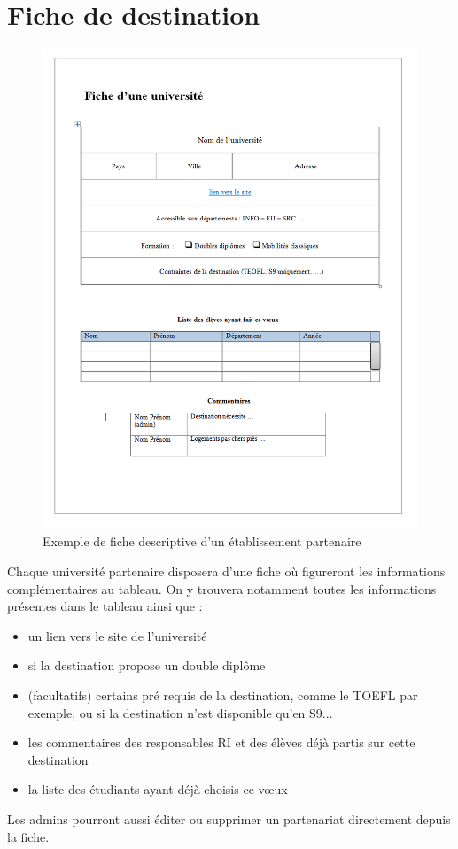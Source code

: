  \section{Fiche de destination}
 
 \begin{figure}[H]
 	\centerline{\includegraphics[scale=0.5]{Universites/ficheUniv.png}}
 	\caption{Exemple de fiche descriptive d'un établissement partenaire}
 \end{figure}
 
 Chaque université partenaire disposera d'une fiche où figureront les informations complémentaires au tableau.
 On y trouvera notamment toutes les informations présentes dans le tableau ainsi que :
 \begin{itemize}
 	\item un lien vers le site de l'université
 	\item si la destination propose un double diplôme
 	\item (facultatifs) certains pré requis de la destination, comme le TOEFL par exemple, ou si la destination n'est disponible qu'en S9...
 	\item les commentaires des responsables RI et des élèves déjà partis sur cette destination
 	\item la liste des étudiants ayant déjà choisis ce vœux
 \end{itemize}
 

 
 Les admins pourront aussi éditer ou supprimer un partenariat directement depuis la fiche.